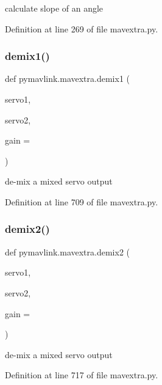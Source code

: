 \begin{DoxyVerb}calculate slope of an angle\end{DoxyVerb}
 

Definition at line 269 of file mavextra.\+py.

\mbox{\label{namespacepymavlink_1_1mavextra_adf962a14bd3df2e4c752b3ac3c016674}} 
\subsubsection{\texorpdfstring{demix1()}{demix1()}}
{\footnotesize\ttfamily def pymavlink.\+mavextra.\+demix1 (\begin{DoxyParamCaption}\item[{}]{servo1,  }\item[{}]{servo2,  }\item[{}]{gain = {} }\end{DoxyParamCaption})}

\begin{DoxyVerb}de-mix a mixed servo output\end{DoxyVerb}
 

Definition at line 709 of file mavextra.\+py.

\mbox{\label{namespacepymavlink_1_1mavextra_acb35268957b8dd904a70309763ab2c95}} 
\subsubsection{\texorpdfstring{demix2()}{demix2()}}
{\footnotesize\ttfamily def pymavlink.\+mavextra.\+demix2 (\begin{DoxyParamCaption}\item[{}]{servo1,  }\item[{}]{servo2,  }\item[{}]{gain = {} }\end{DoxyParamCaption})}

\begin{DoxyVerb}de-mix a mixed servo output\end{DoxyVerb}
 

Definition at line 717 of file mavextra.\+py.

